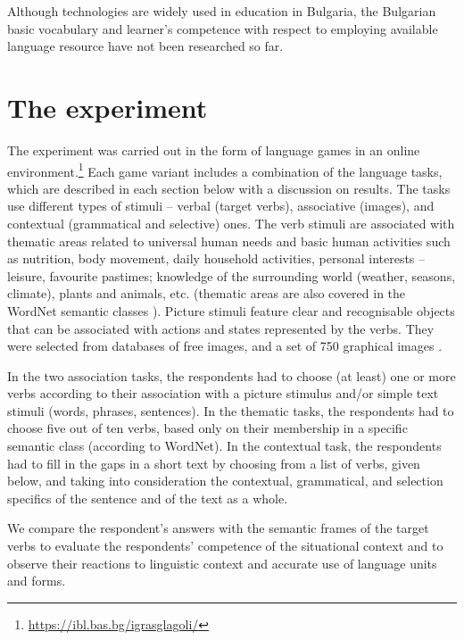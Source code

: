 \documentclass[output=paper,colorlinks,citecolor=brown]{langscibook}
\begin{document}
Although technologies are widely used in education in Bulgaria, the Bulgarian basic vocabulary and learner's competence with respect to employing available language resource have not been researched so far.



\section{The experiment}\label{sec:3}

The experiment was carried out in the form of language games in an online environment.\footnote{\url{https://ibl.bas.bg/igrasglagoli/}} Each game variant includes a combination of the language tasks, which are described in each section below with a discussion on results. The tasks use different types of stimuli -- verbal (target verbs), associative (images), and contextual (grammatical and selective) ones. The verb stimuli are associated with thematic areas related to universal human needs and basic human activities such as nutrition, body movement, daily household activities, personal interests -- leisure, favourite pastimes; knowledge of the surrounding world (weather, seasons, climate), plants and animals, etc. (thematic areas are also covered in the WordNet semantic classes \citep{Milleretall:90}). 
Picture stimuli feature clear and recognisable objects that can be associated with actions and states represented by the verbs. They were selected from databases of free images, and a set of 750 graphical images \citet{Dunabeitiaetal2018}. 


In the two association tasks, the respondents had to choose (at least) one or more verbs according to their association with a picture stimulus and/or simple text stimuli (words, phrases, sentences). In the thematic tasks, the respondents had to choose five out of ten verbs, based only on their membership in a specific semantic class (according to WordNet). In the contextual task, the respondents had to fill in the gaps in a short text by choosing from a list of verbs, given below, and taking into consideration the contextual, grammatical, and selection specifics of the sentence and of the text as a whole. 

We compare the respondent's answers with the semantic frames of the target verbs to evaluate the respondents' competence of the situational context and to observe their reactions to linguistic context and accurate use of language units and forms.
\end{document}
